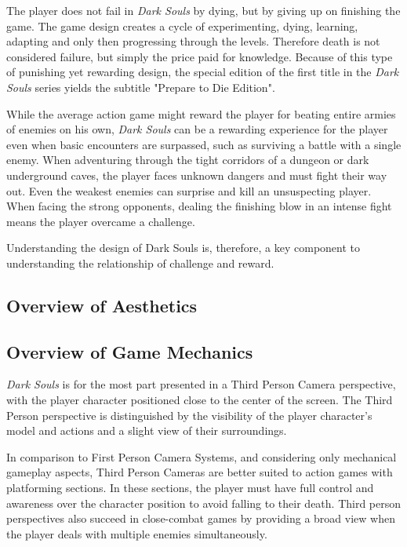 \documentclass[cic,tc,english]{iiufrgs}
\begin{document}
The player does not fail in \emph{Dark Souls} by dying, but by giving up on finishing the game. The game design creates a cycle of experimenting, dying, learning, adapting and only then progressing through the levels. Therefore death is not considered failure, but simply the price paid for knowledge. Because of this type of punishing yet rewarding design, the special edition of the first title in the \emph{Dark Souls} series yields the subtitle "Prepare to Die Edition".

While the average action game might reward the player for beating entire armies of enemies on his own, \emph{Dark Souls} can be a rewarding experience for the player even when basic encounters are surpassed, such as surviving a battle with a single enemy. When adventuring through the tight corridors of a dungeon or dark underground caves, the player faces unknown dangers and must fight their way out. Even the weakest enemies can surprise and kill an unsuspecting player. When facing the strong opponents, dealing the finishing blow in an intense fight means the player overcame a challenge.

Understanding the design of Dark Souls is, therefore, a key component to understanding the relationship of challenge and reward.

\subsection{Overview of Aesthetics}

\subsection{Overview of Game Mechanics}

\emph{Dark Souls} is for the most part presented in a Third Person Camera perspective, with the player character positioned close to the center of the screen. The Third Person perspective is distinguished by the visibility of the player character's model and actions and a slight view of their surroundings.

In comparison to First Person Camera Systems, and considering only mechanical gameplay aspects, Third Person Cameras are better suited to action games with platforming sections. In these sections, the player must have full control and awareness over the character position to avoid falling to their death. Third person perspectives also succeed in close-combat games by providing a broad view when the player deals with multiple enemies simultaneously.
\end{document}
